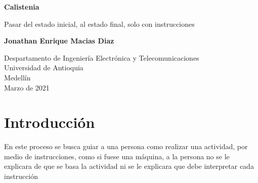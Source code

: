 \documentclass{article}
\begin{document}
\begin{titlepage}
    \begin{center}
        \vspace*{1cm}
            
        \Huge
        \textbf{Calistenia}
            
        \vspace{0.5cm}
        \LARGE
        Pasar del estado inicial, al estado final, solo con instrucciones
            
        \vspace{1.5cm}
            
        \textbf{Jonathan Enrique Macias Diaz}
            
        \vfill
            
        \vspace{0.8cm}
            
        \Large
        Despartamento de Ingeniería Electrónica y Telecomunicaciones\\
        Universidad de Antioquia\\
        Medellín\\
        Marzo de 2021
            
    \end{center}
\end{titlepage}

\tableofcontents
\newpage
\section{Introducción}\label{intro}
En este proceso se busca guiar a una persona como realizar una actividad, por medio de instrucciones, como si fuese una máquina, a la persona no se le explicara de que se basa la actividad ni se le explicara que debe interpretar cada instrucción
\end{document}
